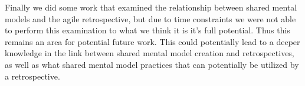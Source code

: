 Finally we did some work that examined the relationship between shared mental models and the agile retrospective, but due to time constraints we were not able to perform this examination to what we think it is it's full potential. Thus this remains an area for potential future work. This could potentially lead to a deeper knowledge in the link between shared mental model creation and retrospectives, as well as what shared mental model practices that can potentially be utilized by a retrospective. 

